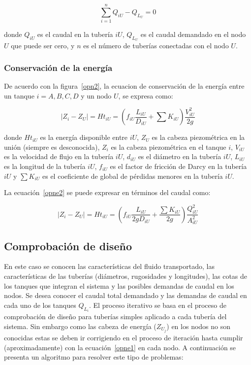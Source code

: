 \documentclass[11pt, oneside]{article}
\begin{document}
\begin{equation}
\sum_{i=1}^{n} Q_{iU} - Q_{L_U} = 0
\label{opne1}
\end{equation}

donde $Q_{iU}$ es el caudal en la tuber\'ia $iU$, $Q_{L_U}$ es el caudal demandado en el nodo $U$ que puede ser cero, y $n$ es el n\'umero de tuber\'ias conectadas con el nodo $U$. 

\subsubsection*{Conservaci\'on de la energ\'ia}
De acuerdo con la figura~\ref{opn2}, la ecuacion de conservaci\'on de la energ\'ia entre un tanque $i = A,B,C,D$ y un nodo $U$, se expresa como:

\begin{equation}
| Z_i - Z_U | =Ht_{iU}= \left( f_{iU} \frac{L_{iU}}{D_{iU}} + \sum K_{iU} \right)\frac{V_{iU}^2}{2g}
\label{opne2}
\end{equation}

donde $Ht_{iU}$ es la energ\'ia disponible entre $iU$, $Z_U$ es la cabeza piezom\'etrica en la uni\'on (siempre es desconocida), $Z_i$ es la cabeza piezom\'etrica en el tanque $i$, $V_{iU}$ es la velocidad de flujo en la tuber\'ia $iU$, $d_{iU}$ es el di\'ametro en la tuber\'ia $iU$, $L_{iU}$ es la longitud de la tuber\'ia $iU$, $f_{iU}$ es el factor de fricci\'on de Darcy en la tuber\'ia $iU$ y $\sum K_{iU}$ es el coeficiente de global de p\'erdidas menores en la tuber\'ia $iU$.

La ecuaci\'on~\ref{opne2} se puede expresar en t\'erminos del caudal como:

\begin{equation}
| Z_i - Z_U | =Ht_{iU}= \left( f_{iU} \frac{L_{iU}}{2gD_{iU}} + \frac{\sum K_{iU}}{2g} \right)\frac{Q_{iU}^2}{A_{iU}^2}
\label{opne3}
\end{equation}


\subsection{Comprobaci\'on de dise\~no} 
En este caso se conocen las caracter\'isticas del fluido transportado, las caracter\'isticas de las tuber\'ias (di\'ametros, rugosidades y longitudes), las cotas de los tanques que integran el sistema y las posibles demandas de caudal en los nodos. Se desea conocer el caudal total demandado y las demandas de caudal en cada uno de los tanques $Q_{L_i}$. El proceso iterativo se basa en el proceso de comprobaci\'on de dise\~no para tuber\'ias simples aplicado a cada tuber\'ia del sistema. Sin embargo como las cabeza de energ\'ia ($Z_{U_j}$) en los nodos no son conocidas estas se deben ir corrigiendo en el proceso de iteraci\'on hasta cumplir (aproximadamente) con la ecuaci\'on~\ref{opne1} en cada nodo. A continuaci\'on se presenta un algoritmo para resolver este tipo de problemas:
\end{document}
